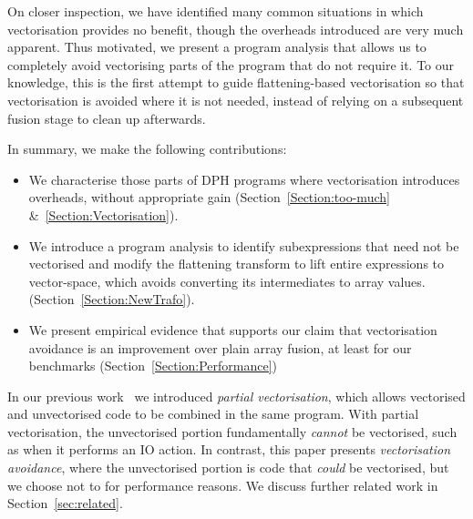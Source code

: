On closer inspection, we have identified many common situations in which vectorisation provides no benefit, though the overheads introduced are very much apparent. Thus motivated, we present a program analysis that allows us to completely avoid vectorising parts of the program that do not require it. To our knowledge, this is the first attempt to guide flattening-based vectorisation so that vectorisation is avoided where it is not needed, instead of relying on a subsequent fusion stage to clean up afterwards. 

In summary, we make the following contributions:
%
\begin{itemize}
\item We characterise those parts of DPH programs where vectorisation introduces overheads, without appropriate gain (Section~\ref{Section:too-much} \&~\ref{Section:Vectorisation}).

\item We introduce a program analysis to identify subexpressions that need not be vectorised and modify the flattening transform to lift entire expressions to vector-space, which avoids converting its intermediates to array values. (Section~\ref{Section:NewTrafo}).

\item We present empirical evidence that supports our claim that vectorisation avoidance is an improvement over plain array fusion, at least for our benchmarks (Section~\ref{Section:Performance})
\end{itemize}
%

In our previous work~\cite{chak-etal:partial-vectorisation} we introduced \emph{partial vectorisation}, which allows vectorised and unvectorised code to be combined in the same program. With partial vectorisation, the unvectorised portion fundamentally \emph{cannot} be vectorised, such as when it performs an IO action. In contrast, this paper presents \emph{vectorisation avoidance}, where the unvectorised portion is code that \emph{could} be vectorised, but we choose not to for performance reasons. We discuss further related work in Section~\ref{sec:related}.
